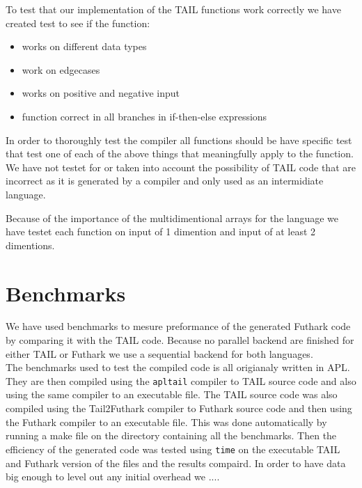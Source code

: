 \documentclass[11pt]{article}
\begin{document}
To test that our implementation of the TAIL functions work correctly we have created test to see if the function:
\begin{itemize}
\item works on different data types
\item work on edgecases
\item works on positive and negative input
\item function correct in all branches in if-then-else expressions
\end{itemize}
In order to thoroughly test the compiler all functions should be have specific test that test one of each of the above things
that meaningfully apply to the function. \\

We have not testet for or taken into account the possibility of TAIL code that are incorrect as it is generated by a compiler and only used as an intermidiate language. 

Because of the importance of the multidimentional arrays for the language we have testet each function on input of 1 dimention and input of at least 2 dimentions. 

\section{Benchmarks}
We have used benchmarks to mesure preformance of the generated Futhark code by comparing it with the TAIL code.
Because no parallel backend are finished for either TAIL or Futhark we use a sequential backend for both languages. \\

The benchmarks used to test the compiled code is all origianaly written in APL. They are then compiled using the {\tt apltail} compiler to TAIL source code and also using the same compiler to an executable file. The TAIL source code was also compiled using the Tail2Futhark compiler to Futhark source code and then using the Futhark compiler to an executable file. This was done automatically by running a make file on the directory containing all the benchmarks.
Then the efficiency of the generated code was tested using {\tt time} on the executable TAIL and Futhark version of the files and the results compaird. In order to have data big enough to level out any initial overhead we ....\\
\end{document}
